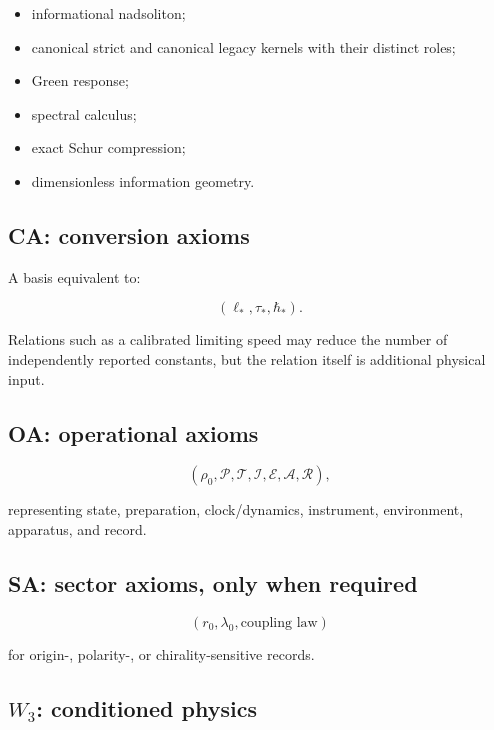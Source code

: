 \documentclass[11pt,a4paper,openany]{report}
\begin{document}
\begin{itemize}
\item 
informational nadsoliton;

\item 
canonical strict and canonical legacy kernels with their distinct roles;

\item 
Green response;

\item 
spectral calculus;

\item 
exact Schur compression;

\item 
dimensionless information geometry.

\end{itemize}

\subsection{CA: conversion axioms}

A basis equivalent to:

\[
(\ell_*,\tau_*,\hbar_*).
\]

Relations such as a calibrated limiting speed may reduce the number of independently reported constants, but the relation itself is additional physical input.

\subsection{OA: operational axioms}

\[
(\rho_0,\mathcal P,\mathcal T,\mathcal I,\mathcal E,\mathcal A,\mathcal R),
\]

representing state, preparation, clock/\allowbreak{}dynamics, instrument, environment, apparatus, and record.

\subsection{SA: sector axioms, only when required}

\[
(r_0,\lambda_0,\text{coupling law})
\]

for origin-, polarity-, or chirality-sensitive records.

\subsection{\texorpdfstring{\(W_3\): conditioned physics}{W\_3: conditioned physics}}
\end{document}
